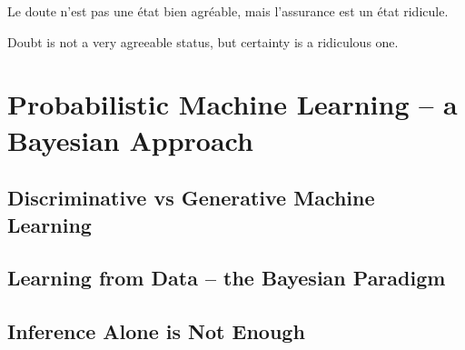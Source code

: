 
\begin{savequote}[8cm]
	\textlatin{Le doute n'est pas une état bien agréable, mais l'assurance est un état ridicule.}
	
	Doubt is not a very agreeable status, but certainty is a ridiculous one.
\end{savequote}


\chapter{Probabilistic Machine Learning -- a Bayesian Approach}
\label{chp:bayes}


\section{Discriminative vs Generative Machine Learning}
\label{sec:bayes:discrim}



\section{Learning from Data -- the Bayesian Paradigm}
\label{sec:bayes:paradigm}



\section{Inference Alone is Not Enough}